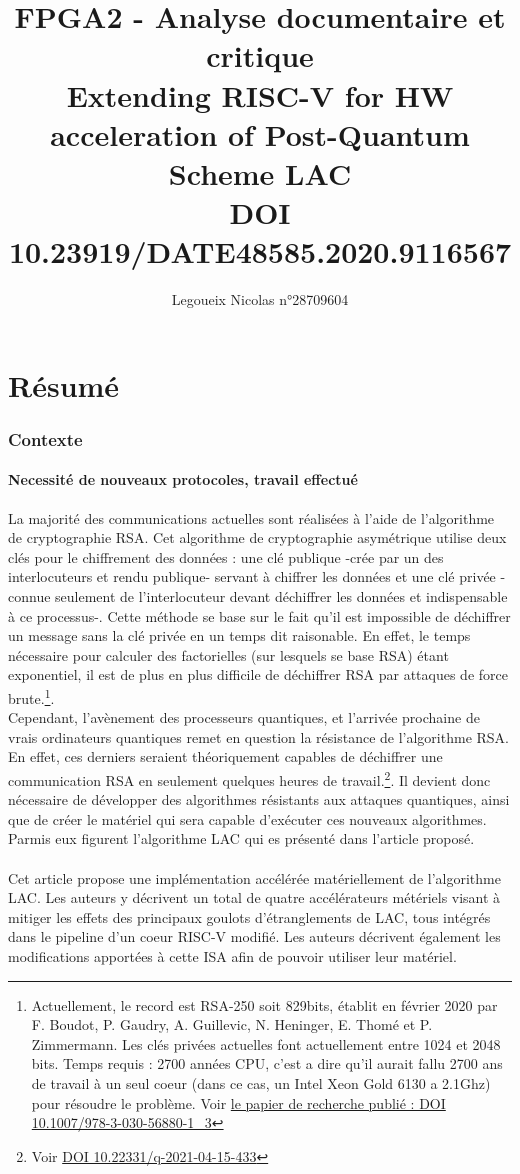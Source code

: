 \documentclass[10pt,a4paper]{article}
\author{Legoueix Nicolas n°28709604}
\title{FPGA2 - Analyse documentaire et critique \\ Extending RISC-V for HW acceleration of Post-Quantum Scheme LAC \\ DOI 10.23919/DATE48585.2020.9116567}
\begin{document}
\maketitle
\newpage
\part{Résumé}

\section{Contexte}
\subsection{Necessité de nouveaux protocoles, travail effectué}
La majorité des communications actuelles sont réalisées à l'aide de l'algorithme de cryptographie RSA. Cet algorithme de cryptographie asymétrique utilise deux clés pour le 
chiffrement des données : une clé publique -crée par un des interlocuteurs et rendu publique- servant à chiffrer les données et une clé privée -connue seulement de l'interlocuteur devant déchiffrer 
les données et indispensable à ce processus-. Cette méthode se base sur le fait qu'il est impossible de déchiffrer un message sans la clé privée en un temps dit raisonable. En effet, le temps nécessaire 
pour calculer des factorielles (sur lesquels se base RSA) étant exponentiel, il est de plus en plus difficile de déchiffrer RSA par attaques de force brute.\footnote{Actuellement, le record est RSA-250 soit 829bits, 
établit en février 2020 par F. Boudot, P. Gaudry, A. Guillevic, N. Heninger, E. Thomé et P. Zimmermann. Les clés privées actuelles font actuellement entre 1024 et 2048 bits. Temps requis : 
2700 années CPU, c'est a dire qu'il aurait fallu 2700 ans de travail à un seul coeur (dans ce cas, un Intel Xeon Gold 6130 a 2.1Ghz) pour résoudre le problème. Voir \href{https://eprint.iacr.org/2020/697.pdf}{le papier de recherche publié : DOI 10.1007/978-3-030-56880-1\_3} }.\\
Cependant, l'avènement des processeurs quantiques, et l'arrivée prochaine de vrais ordinateurs quantiques remet en question la résistance de l'algorithme RSA. En effet, ces derniers seraient théoriquement
capables de déchiffrer une communication RSA en seulement quelques heures de travail.\footnote{Voir \href{https://quantum-journal.org/papers/q-2021-04-15-433/pdf/}{DOI 10.22331/q-2021-04-15-433}}. Il devient donc nécessaire
de développer des algorithmes résistants aux attaques quantiques, ainsi que de créer le matériel qui sera capable d'exécuter ces nouveaux algorithmes. Parmis eux figurent l'algorithme LAC qui es présenté dans l'article proposé.\\~\\
Cet article propose une implémentation accélérée matériellement de l'algorithme LAC. Les auteurs y décrivent un total de quatre accélérateurs métériels visant à mitiger les effets des principaux goulots d'étranglements 
de LAC, tous intégrés dans le pipeline d'un coeur RISC-V modifié. Les auteurs décrivent également les modifications apportées à cette ISA afin de pouvoir utiliser leur matériel.
\end{document}
